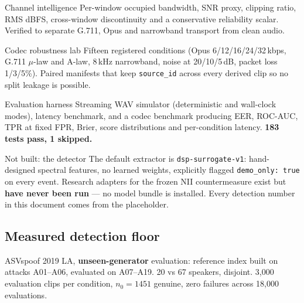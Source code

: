 \documentclass[11pt,a4paper]{article}
\newcommand{\code}[1]{\texttt{\small #1}}
\begin{document}
\begin{donebox}{Channel intelligence}
Per-window occupied bandwidth, SNR proxy, clipping ratio, RMS dBFS, cross-window
discontinuity and a conservative reliability scalar. Verified to separate G.711,
Opus and narrowband transport from clean audio.
\end{donebox}

\begin{donebox}{Codec robustness lab}
Fifteen registered conditions (Opus 6/12/16/24/32\,kbps, G.711 $\mu$-law and
A-law, 8\,kHz narrowband, noise at 20/10/5\,dB, packet loss 1/3/5\%). Paired
manifests that keep \code{source\_id} across every derived clip so no split
leakage is possible.
\end{donebox}

\begin{donebox}{Evaluation harness}
Streaming WAV simulator (deterministic and wall-clock modes), latency benchmark,
and a codec benchmark producing EER, ROC-AUC, TPR at fixed FPR, Brier, score
distributions and per-condition latency. \textbf{183 tests pass, 1 skipped.}
\end{donebox}

\begin{warnbox}{Not built: the detector}
The default extractor is \code{dsp-surrogate-v1}: hand-designed spectral features,
no learned weights, explicitly flagged \code{demo\_only: true} on every event.
Research adapters for the frozen NII countermeasure exist but \textbf{have never
been run} --- no model bundle is installed. Every detection number in this
document comes from the placeholder.
\end{warnbox}

\subsection{Measured detection floor}

ASVspoof 2019 LA, \textbf{unseen-generator} evaluation: reference index built on
attacks A01--A06, evaluated on A07--A19. 20 vs 67 speakers, disjoint. 3{,}000
evaluation clips per condition, $n_0 = 1451$ genuine, zero failures across 18{,}000
evaluations.
\end{document}
